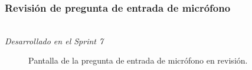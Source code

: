 \newpage

\subsubsection{Revisión de pregunta de entrada de micrófono}\mbox{}\\

\label{sec:pregunic1b}
\textit{Desarrollado en el Sprint 7}
\begin{figure}[H]%
  \centering
  \qquad
  \caption{Pantalla de la pregunta de entrada de micrófono en revisión.}%
  \label{fig:example}%
\end{figure}


